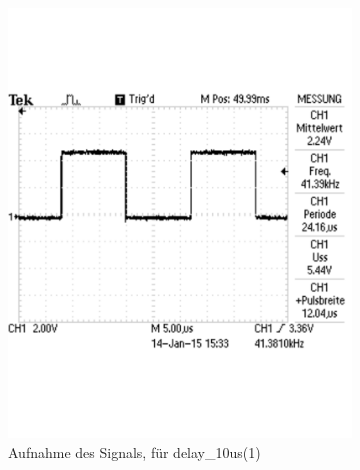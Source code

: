 \documentclass[12pt,a4paper]{article}
\begin{document}
\begin{figure}[H]
\centering
\begin{subfigure}[b]{0.28\textwidth} 	
  \includegraphics[trim = 0mm 50mm 0mm 50mm, clip, width=\textwidth, scale = 0.4]{TEK0011.pdf}
  \caption[Aufnahme des Signals, für delay\_10us(1)]{Aufnahme des Signals, für delay\_10us(1)} 
  \label{fig:g_6}
\end{subfigure}
\hfill
\begin{subfigure}[b]{0.28\textwidth}	

\end{subfigure}
\end{figure}
\end{document}
